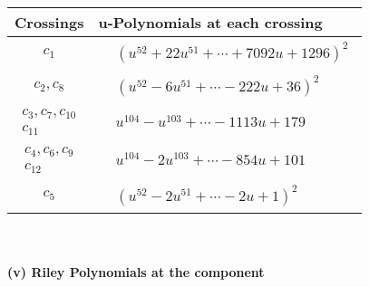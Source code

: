 \documentclass[1p]{elsarticle_modified}
\theoremstyle{definition}
\begin{document}
\begin{tabular}{m{50pt}|m{274pt}}
Crossings & \hspace{64pt}u-Polynomials at each crossing \\
\hline $$\begin{aligned}c_{1}\end{aligned}$$&$\begin{aligned}
&(u^{52}+22 u^{51}+\cdots+7092 u+1296)^{2}
\end{aligned}$\\
\hline $$\begin{aligned}c_{2},c_{8}\end{aligned}$$&$\begin{aligned}
&(u^{52}-6 u^{51}+\cdots-222 u+36)^{2}
\end{aligned}$\\
\hline $$\begin{aligned}c_{3},c_{7},c_{10}\\c_{11}\end{aligned}$$&$\begin{aligned}
&u^{104}- u^{103}+\cdots-1113 u+179
\end{aligned}$\\
\hline $$\begin{aligned}c_{4},c_{6},c_{9}\\c_{12}\end{aligned}$$&$\begin{aligned}
&u^{104}-2 u^{103}+\cdots-854 u+101
\end{aligned}$\\
\hline $$\begin{aligned}c_{5}\end{aligned}$$&$\begin{aligned}
&(u^{52}-2 u^{51}+\cdots-2 u+1)^{2}
\end{aligned}$\\
\hline
\end{tabular}\\~\\
\newpage\renewcommand{\arraystretch}{1}
\flushleft \textbf{(v) Riley Polynomials at the component}\newline \\
\end{document}
